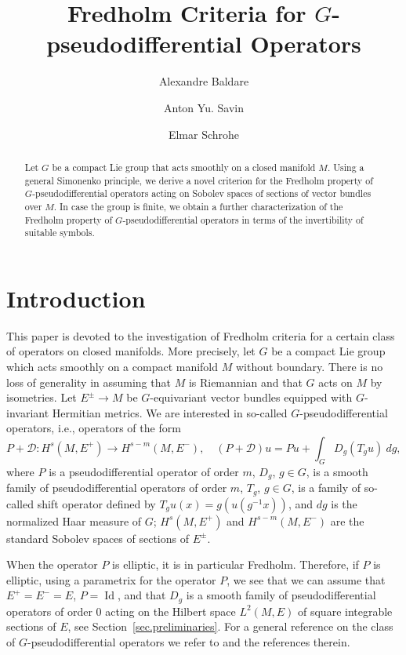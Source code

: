 \documentclass[11pt,a4paper]{amsart}
\title[Fredholm Criteria for $G$-pseudodifferential Operators]{Fredholm Criteria for  $G$-pseudodifferential Operators
}
\author[A. Baldare]{Alexandre Baldare}
\author[A.Yu. Savin]{Anton Yu. Savin}
\author[E. Schrohe]{Elmar Schrohe}
\newcommand{\maD}{\mathcal D}
\newcommand\<{\langle}
\renewcommand\>{\rangle}
\newcommand{\oid}{\operatorname{Id}}
\theoremstyle{definition}
\begin{document}
\begin{abstract}
Let $G$ be a compact Lie group that acts smoothly on a closed manifold $M$. 
Using a general Simonenko principle, we derive a novel criterion for the Fredholm property of $G$-pseudodifferential operators acting on Sobolev spaces of sections of vector bundles over $M$. 
In case the group is finite, we obtain  a further characterization of the Fredholm property of
$G$-pseudodifferential operators in terms of the invertibility of suitable symbols. %
\end{abstract}

\maketitle \tableofcontents


\section*{Introduction}

This paper is devoted to the investigation of Fredholm criteria for a certain class of operators on closed manifolds. More precisely, let $G$ be a compact Lie group which acts smoothly on a compact manifold $M$ without boundary. There is no loss of generality in assuming that $M$ is Riemannian and that $G$ acts on $M$ by isometries. Let $E^\pm \rightarrow M$ be $G$-equivariant vector bundles equipped with $G$-invariant Hermitian metrics. We are interested in so-called $G$-pseudodifferential operators, i.e., operators of the form
\begin{equation}\label{eq.intro.Gop}
P + \maD : H^{s}(M,E^+) \rightarrow H^{s-m}(M,E^-),\quad (P + \maD) u=Pu + \int_G D_g (T_gu) \ dg,
\end{equation}
where $P$ is a pseudodifferential operator of order $m$, $D_g$, $g\in G$, is a smooth family of pseudodifferential operators of order $m$, $T_g$, $g\in G$,  is a family of so-called shift operator defined by
$T_gu(x)=g(u(g^{-1}x))$, and $dg$ is the normalized Haar measure of $G$; $H^s(M,E^+)$ and $H^{s-m}(M,E^-)$ are the standard Sobolev spaces of sections of $E^\pm$. 

When the operator $P$ is elliptic, it is in particular Fredholm.  Therefore, if $P$ is elliptic, using a parametrix for the operator $P$, we see that we can assume that $E^+=E^-=E$, $P=\oid$, and that $D_g$ is a smooth family of pseudodifferential operators of order $0$ acting on the Hilbert space $L^2(M,E)$ of square integrable sections of $E$, see Section~\ref{sec.preliminaries}. 
For a general reference on the class of $G$-pseudodifferential operators we refer to 
\cite{AL94,%
ABL98b,Savin.unif,Sternin.unif} and the references therein.  
\end{document}

